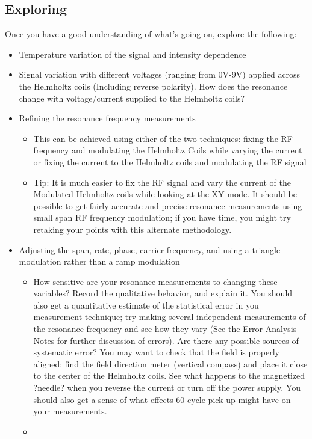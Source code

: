 \documentclass[11pt]{article}
\begin{document}
\subsection{Exploring}
Once you have a good understanding of what's going on, explore the following:
\begin{itemize}
\item Temperature variation of the signal and intensity dependence
\item Signal variation with different voltages (ranging from 0V-9V) applied across the Helmholtz coils (Including reverse polarity). How does the resonance change with voltage/current supplied to the Helmholtz coils?
\item Refining the resonance frequency measurements
	\begin{itemize}
	\item This can be achieved using either of the two techniques: fixing the RF frequency and modulating the Helmholtz Coils while varying the current or fixing the current to the Helmholtz coils and modulating the RF signal
	\item Tip: It is much easier to fix the RF signal and vary the current of the Modulated Helmholtz coils while looking at the XY mode. It should be possible to get fairly accurate and precise resonance measurements using small span RF frequency modulation; if you have time, you might try retaking your points with this alternate methodology.
	\end{itemize}
\item Adjusting the span, rate, phase, carrier frequency, and using a triangle modulation rather than a ramp modulation
	\begin{itemize}
	\item How sensitive are your resonance measurements to changing these variables? Record the qualitative behavior, and explain it. You should also get a quantitative estimate of the statistical error in you measurement technique; try making several independent measurements of the resonance frequency and see how they vary (See the Error Analysis Notes for further discussion of errors). Are there any possible sources of systematic error? You may want to check that the field is properly aligned; find the field direction meter (vertical compass) and place it close to the center of the Helmholtz coils. See what happens to the magnetized ?needle? when you reverse the current or turn off the power supply. You should also get a sense of what effects 60 cycle pick up might have on your measurements.
	\item \fbox{
}
\end{itemize}
\end{itemize}
\end{document}
